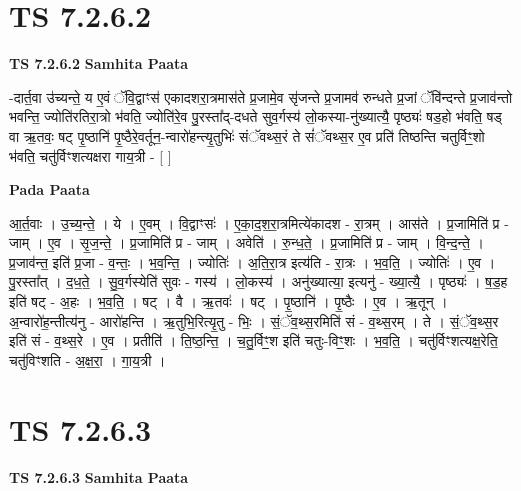 \documentclass[17pt]{extarticle}
\begin{document}
\section*{ TS 7.2.6.2 }

\textbf{TS 7.2.6.2 } \newline
\textbf{Samhita Paata} \newline

-दार्त॒वा उ॑च्यन्ते॒ य ए॒वं ॅवि॒द्वाꣳस॑ एकादशरा॒त्रमास॑ते प्र॒जामे॒व सृ॑जन्ते प्र॒जामव॑ रुन्धते प्र॒जां ॅवि॑न्दन्ते प्र॒जाव॑न्तो भवन्ति॒ ज्योति॑रतिरा॒त्रो भ॑वति॒ ज्योति॑रे॒व पु॒रस्ता᳚द्-दधते सुव॒र्गस्य॑ लो॒कस्या-नु॑ख्यात्यै॒ पृष्ठ्यः॑ षड॒हो भ॑वति॒ षड् वा ऋ॒तवः॒ षट् पृ॒ष्ठानि॑ पृ॒ष्ठैरे॒वर्तून॒-न्वारो॑हन्त्यृ॒तुभिः॑ संॅवथ्स॒रं ते सं॑ॅवथ्स॒र ए॒व प्रति॑ तिष्ठन्ति चतुर्विꣳ॒॒शो भ॑वति॒ चतु॑र्विꣳशत्यक्षरा गाय॒त्री - [  ] \newline

\textbf{Pada Paata} \newline

आ॒र्त॒वाः । उ॒च्य॒न्ते॒ । ये । ए॒वम् । वि॒द्वाꣳसः॑ । ए॒का॒द॒श॒रा॒त्रमित्ये॑कादश - रा॒त्रम् । आस॑ते । प्र॒जामिति॑ प्र - जाम् । ए॒व । सृ॒ज॒न्ते॒ । प्र॒जामिति॑ प्र - जाम् । अवेति॑ । रु॒न्ध॒ते॒ । प्र॒जामिति॑ प्र - जाम् । वि॒न्द॒न्ते॒ । प्र॒जाव॑न्त॒ इति॑ प्र॒जा - व॒न्तः॒ । भ॒व॒न्ति॒ । ज्योतिः॑ । अ॒ति॒रा॒त्र इत्य॑ति - रा॒त्रः । भ॒व॒ति॒ । ज्योतिः॑ । ए॒व । पु॒रस्ता᳚त् । द॒ध॒ते॒ । सु॒व॒र्गस्येति॑ सुवः - गस्य॑ । लो॒कस्य॑ । अनु॑ख्यात्या॒ इत्यनु॑ - ख्या॒त्यै॒ । पृष्ठ्यः॑ । ष॒ड॒ह इति॑ षट् - अ॒हः । भ॒व॒ति॒ । षट् । वै । ऋ॒तवः॑ । षट् । पृ॒ष्ठानि॑ । पृ॒ष्ठैः । ए॒व । ऋ॒तून् । अ॒न्वारो॑ह॒न्तीत्य॑नु - आरो॑हन्ति । ऋ॒तुभि॒रित्यृ॒तु - भिः॒ । सं॒ॅव॒थ्स॒रमिति॑ सं - व॒थ्स॒रम् । ते । सं॒ॅव॒थ्स॒र इति॑ सं - व॒थ्स॒रे । ए॒व । प्रतीति॑ । ति॒ष्ठ॒न्ति॒ । च॒तु॒र्विꣳ॒॒श इति॑ चतुः-विꣳ॒॒शः । भ॒व॒ति॒ । चतु॑र्विꣳशत्यक्ष॒रेति॒ चतु॑विꣳशति - अ॒क्ष॒रा॒ । गा॒य॒त्री ।  \newline




\section*{ TS 7.2.6.3 }

\textbf{TS 7.2.6.3 } \newline
\textbf{Samhita Paata} \newline
\end{document}
